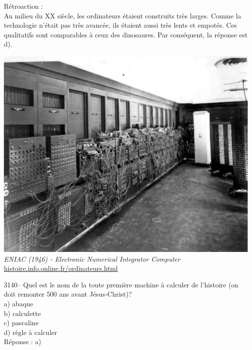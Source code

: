 \documentclass[letterpaper, 12pt]{article}
\begin{document}
R\'etroaction :\\
Au milieu du {\scriptsize XX\ieme{}} si\`ecle, les ordinateurs \'etaient construits tr\`es larges. Comme la technologie n'\'etait pas tr\`es avanc\'ee, ils \'etaient aussi tr\`es lents et empot\'es. Ces qualitatifs sont comparables \`a ceux des dinosaures. Par cons\'equent, la r\'eponse est d).\\
\begin{center}
\includegraphics[scale=0.22]{eniac.eps}\\
\emph{{\small ENIAC (1946) - Electronic Numerical Integrator Computer}}\\
\href{http://histoire.info.online.fr/ordinateurs.html}{histoire.info.online.fr/ordinateurs.html}\\[5mm]
\end{center}



3140-- Quel est le nom de la toute premi\`ere machine \`a calculer de l'histoire (on doit remonter 500 ans avant J\'esus-Christ)?\\

a) abaque\\
b) calculette\\
c) pascaline\\
d) r\`egle \`a calculer\\

R\'eponse : a)\\
\end{document}
